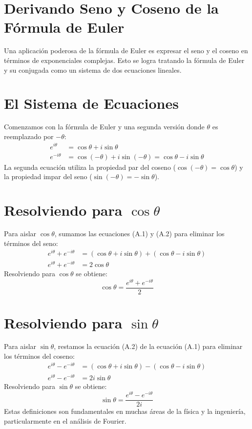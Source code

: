 \documentclass[11pt,a4paper]{book}
\begin{document}
\section{Derivando Seno y Coseno de la Fórmula de Euler}
Una aplicación poderosa de la fórmula de Euler es expresar el seno y el coseno en términos de exponenciales complejas. Esto se logra tratando la fórmula de Euler y su conjugada como un sistema de dos ecuaciones lineales.

\section{El Sistema de Ecuaciones}
Comenzamos con la fórmula de Euler y una segunda versión donde $\theta$ es reemplazado por $-\theta$:
\begin{align*}
    e^{i\theta} &= \cos\theta + i\sin\theta \tag{A.1} \\
    e^{-i\theta} &= \cos(-\theta) + i\sin(-\theta) = \cos\theta - i\sin\theta \tag{A.2}
\end{align*}
La segunda ecuación utiliza la propiedad par del coseno ($\cos(-\theta)=\cos\theta$) y la propiedad impar del seno ($\sin(-\theta)=-\sin\theta$).

\section{Resolviendo para \texorpdfstring{$\cos\theta$}{cos(theta)}}
Para aislar $\cos\theta$, sumamos las ecuaciones (A.1) y (A.2) para eliminar los términos del seno:
\begin{align*}
    e^{i\theta} + e^{-i\theta} &= (\cos\theta + i\sin\theta) + (\cos\theta - i\sin\theta) \\
    e^{i\theta} + e^{-i\theta} &= 2\cos\theta
\end{align*}
Resolviendo para $\cos\theta$ se obtiene:
\[ \boxed{\cos\theta = \frac{e^{i\theta} + e^{-i\theta}}{2}} \]

\section{Resolviendo para \texorpdfstring{$\sin\theta$}{sin(theta)}}
Para aislar $\sin\theta$, restamos la ecuación (A.2) de la ecuación (A.1) para eliminar los términos del coseno:
\begin{align*}
    e^{i\theta} - e^{-i\theta} &= (\cos\theta + i\sin\theta) - (\cos\theta - i\sin\theta) \\
    e^{i\theta} - e^{-i\theta} &= 2i\sin\theta
\end{align*}
Resolviendo para $\sin\theta$ se obtiene:
\[ \boxed{\sin\theta = \frac{e^{i\theta} - e^{-i\theta}}{2i}} \]
Estas definiciones son fundamentales en muchas áreas de la física y la ingeniería, particularmente en el análisis de Fourier.
\end{document}
